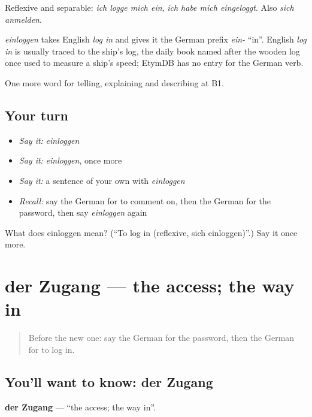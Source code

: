 Reflexive and separable: \emph{ich logge mich ein}, \emph{ich habe mich eingeloggt}. Also \emph{sich anmelden}.

\begin{cousinweb}
\emph{einloggen} takes English \emph{log in} and gives it the German prefix \emph{ein-} \textquotedblleft{}in\textquotedblright{}. English \emph{log in} is usually traced to the ship's log, the daily book named after the wooden log once used to measure a ship's speed; EtymDB has no entry for the German verb.
\end{cousinweb}

\begin{grammarlens}[title={What you've built}]
One more word for telling, explaining and describing at B1.
\end{grammarlens}

\subsection*{Your turn}
\begin{itemize}
\raggedright
  \item \emph{Say it:} \emph{einloggen}
  \item \emph{Say it:} \emph{einloggen}, once more
  \item \emph{Say it:} a sentence of your own with \emph{einloggen}
  \item \emph{Recall:} say the German for to comment on, then the German for the password, then say \emph{einloggen} again
\end{itemize}

\begin{tcolorbox}[breakable,colback=teal!4,colframe=teal!35!black,title={Before you move on}]
What does einloggen mean? (\textquotedblleft{}To log in (reflexive, sich einloggen)\textquotedblright{}.) Say it once more.
\end{tcolorbox}
\section[der Zugang]{der Zugang — the access; the way in}

\label{lesson:GE-C395-zugang}



\begin{quote}
Before the new one: say the German for the password, then the German for to log in.
\end{quote}

\subsection*{You'll want to know: der Zugang}
\textbf{der Zugang} — \textquotedblleft{}the access; the way in\textquotedblright{}.

